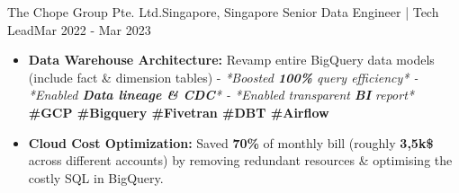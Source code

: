 
\resumeSubheading
{The Chope Group Pte. Ltd.}{Singapore, Singapore}
{Senior Data Engineer | Tech Lead}{Mar 2022 - Mar 2023}
\begin{itemize}
    \item \textbf{Data Warehouse Architecture:} Revamp entire BigQuery data models (include fact \& dimension tables) - \emph{*Boosted \textbf{100\%} query efficiency* - *Enabled \textbf{Data lineage \& CDC}* - *Enabled transparent \textbf{BI} report*} \textbf{\scriptsize{\#GCP \#Bigquery \#Fivetran \#DBT \#Airflow}}
    \item \textbf{Cloud Cost Optimization:} Saved \textbf{70\%} of monthly bill (roughly \textbf{3,5k\$} across different accounts) by removing redundant resources \& optimising the costly SQL in BigQuery.
\end{itemize}


